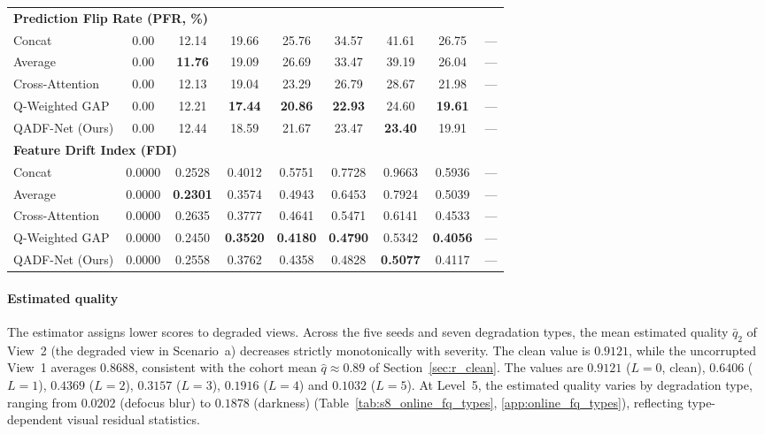 \documentclass[final,5p,times,twocolumn,authoryear]{elsarticle}
\newcommand{\qadfnet}{QADF-Net}
\theoremstyle{plain}
\theoremstyle{remark}
\begin{document}
\begin{table}[!tb]
{\begin{tabular}{lcccccccc}
\midrule
\multicolumn{9}{l}{\textbf{Prediction Flip Rate (PFR, \%)}} \\
\quad Concat          & 0.00 & 12.14 & 19.66 & 25.76 & 34.57 & 41.61 & 26.75 & --- \\
\quad Average         & 0.00 & \textbf{11.76} & 19.09 & 26.69 & 33.47 & 39.19 & 26.04 & --- \\
\quad Cross-Attention & 0.00 & 12.13 & 19.04 & 23.29 & 26.79 & 28.67 & 21.98 & --- \\
\quad Q-Weighted GAP  & 0.00 & 12.21 & \textbf{17.44} & \textbf{20.86} & \textbf{22.93} & 24.60 & \textbf{19.61} & --- \\
\quad \qadfnet{} (Ours) & 0.00 & 12.44 & 18.59 & 21.67 & 23.47 & \textbf{23.40} & 19.91 & --- \\
\midrule
\multicolumn{9}{l}{\textbf{Feature Drift Index (FDI)}} \\
\quad Concat          & 0.0000 & 0.2528 & 0.4012 & 0.5751 & 0.7728 & 0.9663 & 0.5936 & --- \\
\quad Average         & 0.0000 & \textbf{0.2301} & 0.3574 & 0.4943 & 0.6453 & 0.7924 & 0.5039 & --- \\
\quad Cross-Attention & 0.0000 & 0.2635 & 0.3777 & 0.4641 & 0.5471 & 0.6141 & 0.4533 & --- \\
\quad Q-Weighted GAP  & 0.0000 & 0.2450 & \textbf{0.3520} & \textbf{0.4180} & \textbf{0.4790} & 0.5342 & \textbf{0.4056} & --- \\
\quad \qadfnet{} (Ours) & 0.0000 & 0.2558 & 0.3762 & 0.4358 & 0.4828 & \textbf{0.5077} & 0.4117 & --- \\
\bottomrule
\end{tabular}}
\end{table}

\paragraph{Estimated quality} The estimator assigns lower scores to degraded views. Across the five seeds and seven degradation types, the mean estimated quality $\bar{q}_2$ of View~2 (the degraded view in Scenario~a) decreases strictly monotonically with severity. The clean value is $0.9121$, while the uncorrupted View~1 averages $0.8688$, consistent with the cohort mean $\hat{q}\approx 0.89$ of Section~\ref{sec:r_clean}. The values are $0.9121$ ($L=0$, clean), $0.6406$ ($L=1$), $0.4369$ ($L=2$), $0.3157$ ($L=3$), $0.1916$ ($L=4$) and $0.1032$ ($L=5$). At Level~5, the estimated quality varies by degradation type, ranging from $0.0202$ (defocus blur) to $0.1878$ (darkness) (Table~\ref{tab:s8_online_fq_types}, \ref{app:online_fq_types}), reflecting type-dependent visual residual statistics.
\end{document}
